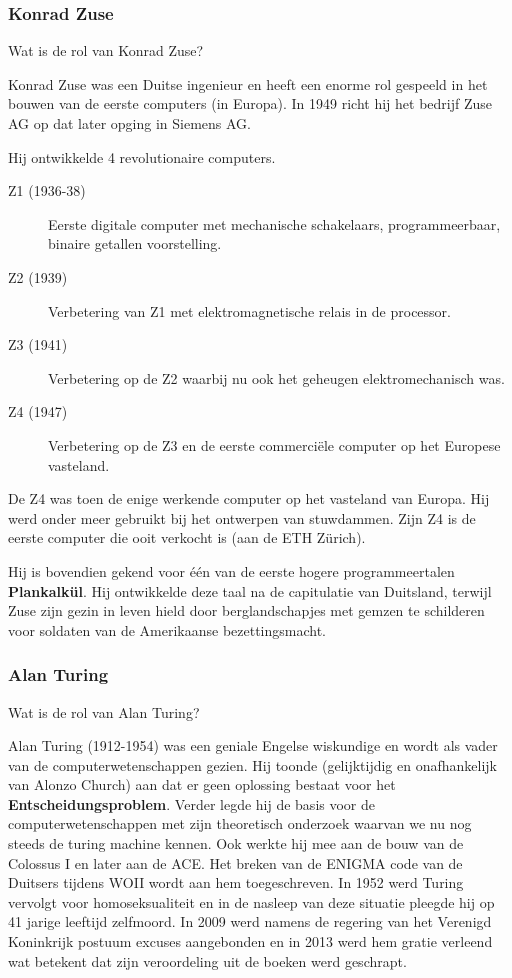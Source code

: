 \documentclass[../main.tex]{subfiles}
\begin{document}
\subsubsection{Konrad Zuse}
\begin{question}
Wat is de rol van Konrad Zuse?
\end{question}
\begin{solution}
Konrad Zuse was een Duitse ingenieur en heeft een enorme rol gespeeld in het bouwen van de eerste computers (in Europa).
In 1949 richt hij het bedrijf Zuse AG op dat later opging in Siemens AG.

Hij ontwikkelde 4 revolutionaire computers.
\begin{description}
		\item[Z1 (1936-38)] Eerste digitale computer met mechanische schakelaars, programmeerbaar, binaire getallen voorstelling.
		\item[Z2 (1939)] Verbetering van Z1 met elektromagnetische relais in de processor.
		\item[Z3 (1941)] Verbetering op de Z2 waarbij nu ook het geheugen elektromechanisch was.
		\item[Z4 (1947)] Verbetering op de Z3 en de eerste commerci\"ele computer op het Europese vasteland.
\end{description}
De Z4 was toen de enige werkende computer op het vasteland van Europa. Hij werd onder meer gebruikt bij het ontwerpen van stuwdammen. Zijn Z4 is de eerste computer die ooit verkocht is (aan de ETH Zürich).

Hij is bovendien gekend voor \'e\'en van de eerste hogere programmeertalen \textbf{Plankalk\"ul}. Hij ontwikkelde deze taal na de capitulatie van Duitsland, terwijl Zuse zijn gezin in leven hield door berglandschapjes met gemzen te schilderen voor soldaten van de Amerikaanse bezettingsmacht.
\end{solution}

\subsubsection{Alan Turing}
\begin{question}
Wat is de rol van Alan Turing?
\end{question}
\begin{solution}
Alan Turing (1912-1954) was een geniale Engelse wiskundige en wordt als vader van de computerwetenschappen gezien.
Hij toonde (gelijktijdig en onafhankelijk van Alonzo Church) aan dat er geen oplossing bestaat voor het \textbf{Entscheidungsproblem}.
Verder legde hij de basis voor de computerwetenschappen met zijn theoretisch onderzoek waarvan we nu nog steeds de turing machine kennen.
Ook werkte hij mee aan de bouw van de Colossus I en later aan de ACE.
Het breken van de ENIGMA code van de Duitsers tijdens WOII wordt aan hem toegeschreven.
In 1952 werd Turing vervolgt voor homoseksualiteit en in de nasleep van deze situatie pleegde hij op 41 jarige leeftijd zelfmoord. In 2009 werd namens de regering van het Verenigd Koninkrijk postuum excuses aangebonden en in 2013 werd hem gratie verleend wat betekent dat zijn veroordeling uit de boeken werd geschrapt.
\end{solution}
\end{document}
